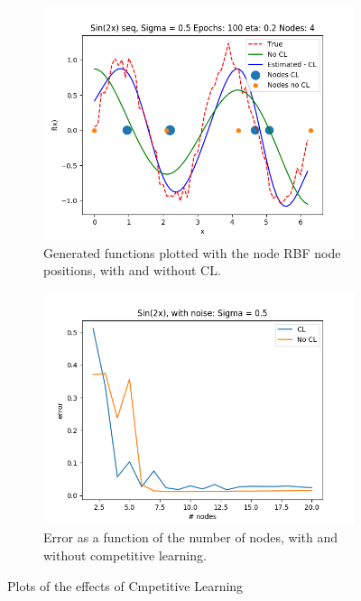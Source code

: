 \documentclass{article}
\begin{document}
\begin{figure}[ht!]
    \centering
    \begin{subfigure}[t]{0.4\textwidth}
        \centering
        \includegraphics[width=1\textwidth]{plots/CL/sin2x_seq_CL_vs_no_cl_plots}
        \caption{Generated functions plotted with the node RBF node positions, with and without CL.}
    \end{subfigure}
    \begin{subfigure}[t]{0.4\textwidth}
        \centering
        \includegraphics[width=1\textwidth]{plots/CL/sin2x_seq_CL_vs_no_cl_plots_error}
        \caption{Error as a function of the number of nodes, with and without competitive learning.}
    \end{subfigure}
    \caption{Plots of the effects of Cmpetitive Learning}
\end{figure}
\end{document}
